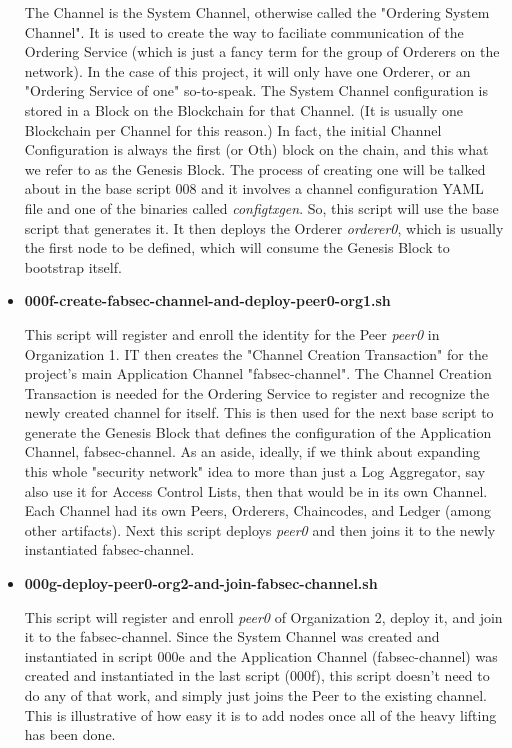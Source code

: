 \begin{itemize}
					\hspace{10mm}The Channel is the System Channel, otherwise called the "Ordering System Channel". It is used to create the way to faciliate communication of the Ordering Service (which is just a fancy term for the group of Orderers on the network). In the case of this project, it will only have one Orderer, or an "Ordering Service of one" so-to-speak. The System Channel configuration is stored in a Block on the Blockchain for that Channel. (It is usually one Blockchain per Channel for this reason.) In fact, the initial Channel Configuration is always the first (or Oth) block on the chain, and this what we refer to as the Genesis Block. The process of creating one will be talked about in the base script 008 and it involves a channel configuration YAML file and one of the binaries called \textit{configtxgen}. So, this script will use the base script that generates it. It then deploys the Orderer \textit{orderer0}, which is usually the first node to be defined, which will consume the Genesis Block to bootstrap itself.
					
				\item \textbf{000f-create-fabsec-channel-and-deploy-peer0-org1.sh}
				
					\hspace{10mm}This script will register and enroll the identity for the Peer \textit{peer0} in Organization 1. IT then creates the "Channel Creation Transaction" for the project's main Application Channel "fabsec-channel". The Channel Creation Transaction is needed for the Ordering Service to register and recognize the newly created channel for itself. This is then used for the next base script to generate the Genesis Block that defines the configuration of the Application Channel, fabsec-channel. As an aside, ideally, if we think about expanding this whole "security network" idea to more than just a Log Aggregator, say also use it for Access Control Lists, then that would be in its own Channel. Each Channel had its own Peers, Orderers, Chaincodes, and Ledger (among other artifacts). Next this script deploys \textit{peer0} and then joins it to the newly instantiated fabsec-channel.
					
				\item \textbf{000g-deploy-peer0-org2-and-join-fabsec-channel.sh}
				
					\hspace{10mm}This script will register and enroll \textit{peer0} of Organization 2, deploy it, and join it to the fabsec-channel. Since the System Channel was created and instantiated in script 000e and the Application Channel (fabsec-channel) was created and instantiated in the last script (000f), this script doesn't need to do any of that work, and simply just joins the Peer to the existing channel. This is illustrative of how easy it is to add nodes once all of the heavy lifting has been done.
					

\end{itemize}
